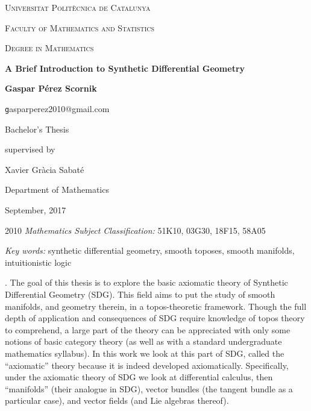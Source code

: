 \documentclass[12pt,twoside]{amsbook}
\begin{document}


\thispagestyle{empty}

\begin{titlepage}
	\centering
	{\scshape\Large Universitat Polit\`ecnica de Catalunya\par}
	\vspace{0.5cm}
	{\scshape\Large Faculty of Mathematics and Statistics\par}
	\vspace{0.5cm}
	{\scshape\Large Degree in Mathematics\par}
	\vspace{1.5cm}
	{\huge\bfseries A Brief Introduction to Synthetic Differential Geometry\par}
	\vspace{2cm}
	{\Large\bfseries Gaspar P\'erez Scornik\par}
	\vspace{0.3cm}
	{\texttt gasparperez2010@gmail.com\par}
	\vfill
	Bachelor's Thesis\par
	supervised by\par
	\vspace{0.3cm}
	Xavier Gr\`acia Sabat\'e\par
  Department of Mathematics

	\vfill

	{\large September, 2017}
\end{titlepage}

\frontmatter

\setcounter{page}{2}

\begin{center}
  2010 {\itshape Mathematics Subject Classification:} 51K10, 03G30, 18F15, 58A05\par
  \vspace{0.3cm}
  {\itshape Key words:} synthetic differential geometry, smooth toposes, smooth manifolds, intuitionistic logic\par
\end{center}

\vspace{0.5cm}

. The goal of this thesis is to explore the basic axiomatic theory of Synthetic Differential Geometry (SDG). This field aims to put the study of smooth manifolds, and geometry therein, in a topos-theoretic framework. Though the full depth of application and consequences of SDG
require knowledge of topos theory to comprehend, a large part of the theory can be appreciated
with only some notions of basic category theory (as well as with a standard undergraduate
mathematics syllabus). In this work we look at this part of SDG, called the “axiomatic” theory
because it is indeed developed axiomatically. Specifically, under the axiomatic theory of SDG
we look at differential calculus, then “manifolds” (their analogue in SDG), vector bundles (the
tangent bundle as a particular case), and vector fields (and Lie algebras thereof).\par
\vspace{0.2cm}
\end{document}
